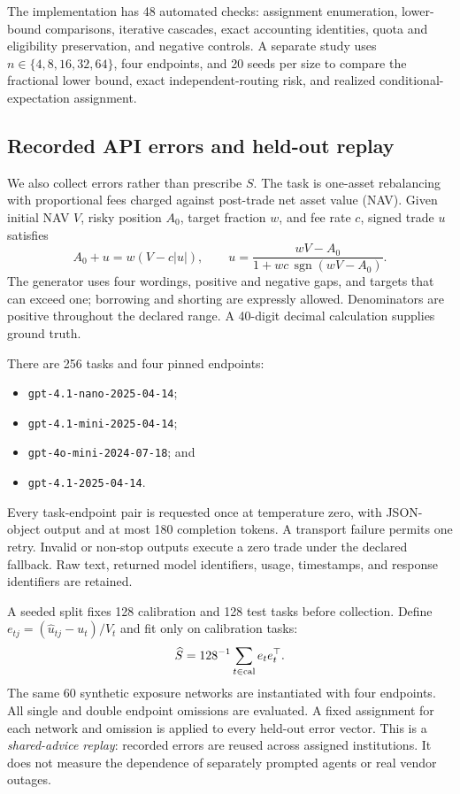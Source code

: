 \documentclass[11pt]{article}
\begin{document}
The implementation has 48 automated checks: assignment enumeration, lower-bound comparisons, iterative cascades, exact accounting identities, quota and eligibility preservation, and negative controls. A separate study uses \(n\in\{4,8,16,32,64\}\), four endpoints, and 20 seeds per size to compare the fractional lower bound, exact independent-routing risk, and realized conditional-expectation assignment.

\subsection{Recorded API errors and held-out replay}
We also collect errors rather than prescribe \(S\). The task is one-asset rebalancing with proportional fees charged against post-trade net asset value (NAV). Given initial NAV \(V\), risky position \(A_0\), target fraction \(w\), and fee rate \(c\), signed trade \(u\) satisfies
\begin{equation}
 A_0+u=w(V-c|u|),\qquad
 u=\frac{wV-A_0}{1+wc\,\operatorname{sgn}(wV-A_0)}.
 \label{eq:rebalance}
\end{equation}
The generator uses four wordings, positive and negative gaps, and targets that can exceed one; borrowing and shorting are expressly allowed. Denominators are positive throughout the declared range. A 40-digit decimal calculation supplies ground truth.

There are 256 tasks and four pinned endpoints:
\begin{itemize}
\item \texttt{gpt-4.1-nano-2025-04-14};
\item 
\texttt{gpt-4.1-mini-2025-04-14};
\item 
\texttt{gpt-4o-mini-2024-07-18}; and
\item 
\texttt{gpt-4.1-2025-04-14}.
\end{itemize}
Every task-endpoint pair is requested once at temperature zero, with JSON-object output and at most 180 completion tokens. A transport failure permits one retry. Invalid or non-stop outputs execute a zero trade under the declared fallback. Raw text, returned model identifiers, usage, timestamps, and response identifiers are retained.

A seeded split fixes 128 calibration and 128 test tasks before collection. Define \(e_{tj}=(\widehat u_{tj}-u_t)/V_t\) and fit only on calibration tasks:
\[
 \widehat S=128^{-1}\sum_{t\in{\rm cal}}e_te_t^\top.
\]
The same 60 synthetic exposure networks are instantiated with four endpoints. All single and double endpoint omissions are evaluated. A fixed assignment for each network and omission is applied to every held-out error vector. This is a \emph{shared-advice replay}: recorded errors are reused across assigned institutions. It does not measure the dependence of separately prompted agents or real vendor outages.
\end{document}
